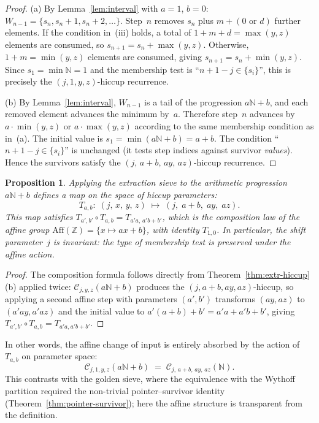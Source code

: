 \documentclass[11pt]{article}
\numberwithin{equation}{section}
\theoremstyle{plain}
\newtheorem{proposition}[theorem]{Proposition}
\theoremstyle{definition}
\theoremstyle{remark}
\newcommand{\N}{\mathbb{N}}
\newcommand{\Z}{\mathbb{Z}}
\begin{document}
\begin{proof}
(a) By Lemma~\ref{lem:interval} with $a=1$, $b=0$:
$W_{n-1}=\{s_n,s_n{+}1,s_n{+}2,\ldots\}$.
Step~$n$ removes $s_n$ plus $m+(0\text{ or }d)$ further elements.
If the condition in~(iii) holds, a total of $1+m+d=\max(y,z)$
elements are consumed, so $s_{n+1}=s_n+\max(y,z)$.
Otherwise, $1+m=\min(y,z)$ elements are consumed, giving
$s_{n+1}=s_n+\min(y,z)$.
Since $s_1=\min\N=1$ and the membership test is
``$n+1-j\in\{s_i\}$'', this is precisely the
$(j,1,y,z)$-hiccup recurrence.

\smallskip
(b) By Lemma~\ref{lem:interval}, $W_{n-1}$ is a tail of the
progression $a\N+b$, and each removed element advances the minimum
by~$a$.  Therefore step~$n$ advances by
$a\cdot\min(y,z)$ or $a\cdot\max(y,z)$
according to the same membership condition as in~(a).
The initial value is $s_1=\min(a\N+b)=a+b$.
The condition ``$n+1-j\in\{s_i\}$'' is unchanged (it tests step
indices against survivor \emph{values}).
Hence the survivors satisfy the $(j,\,a+b,\,ay,\,az)$-hiccup
recurrence.
\end{proof}

\begin{proposition}\label{prop:affine-action}
Applying the extraction sieve to the arithmetic progression
$a\N+b$ defines a map on the space of hiccup parameters:
\begin{equation}\label{eq:affine-action}
  T_{a,b}:\;(j,\,x,\,y,\,z)\;\longmapsto\;(j,\;a+b,\;ay,\;az).
\end{equation}
This map satisfies $T_{a',b'}\circ T_{a,b}=T_{a'a,\,a'b+b'}$,
which is the composition law of the affine group
$\mathrm{Aff}(\Z)=\{x\mapsto ax+b\}$,
with identity $T_{1,0}$.
In particular, the shift parameter~$j$ is invariant: the type
of membership test is preserved under the affine action.
\end{proposition}

\begin{proof}
The composition formula follows directly from Theorem~\ref{thm:extr-hiccup}(b)
applied twice: $\mathcal{C}_{j,y,z}(a\N+b)$ produces the
$(j,a+b,ay,az)$-hiccup, so applying a second affine step with parameters
$(a',b')$ transforms $(ay,az)$ to $(a'ay, a'az)$ and the initial value
to $a'(a+b)+b'=a'a+a'b+b'$, giving $T_{a',b'}\circ T_{a,b}=T_{a'a,a'b+b'}$.
\end{proof}

In other words, the affine change of input is entirely absorbed by the
action of $T_{a,b}$ on parameter space:
\[
  \mathcal{C}_{j,1,y,z}(a\N+b) \;=\; \mathcal{C}_{j,\,a+b,\,ay,\,az}(\N).
\]
This contrasts with the golden sieve, where the equivalence with the
Wythoff partition required the non-trivial pointer--survivor identity
(Theorem~\ref{thm:pointer-survivor}); here the affine structure is
transparent from the definition.
\end{document}
